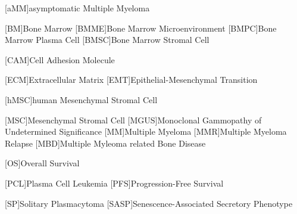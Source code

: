 
%
\label{sec:Abbreviations}%

{
    \small
    \begin{acronym}
        [aMM]{asymptomatic Multiple Myeloma}

        [BM]{Bone Marrow}
        [BMME]{Bone Marrow Microenvironment}
        [BMPC]{Bone Marrow Plasma Cell}
        [BMSC]{Bone Marrow Stromal Cell}

        [CAM]{Cell Adhesion Molecule}

        [ECM]{Extracellular Matrix}
        [EMT]{Epithelial-Mesenchymal Transition}

        [hMSC]{human Mesenchymal Stromal Cell}

        [MSC]{Mesenchymal Stromal Cell}
        [MGUS]{Monoclonal Gammopathy of Undetermined Significance}
        [MM]{Multiple Myeloma}
        [MMR]{Multiple Myeloma Relapse}
        [MBD]{Multiple Myleoma related Bone Disease}

        [OS]{Overall Survival}

        [PCL]{Plasma Cell Leukemia}
        [PFS]{Progression-Free Survival}

        [SP]{Solitary Plasmacytoma}
        [SASP]{Senescence-Associated Secretory Phenotype}


    \end{acronym}
}